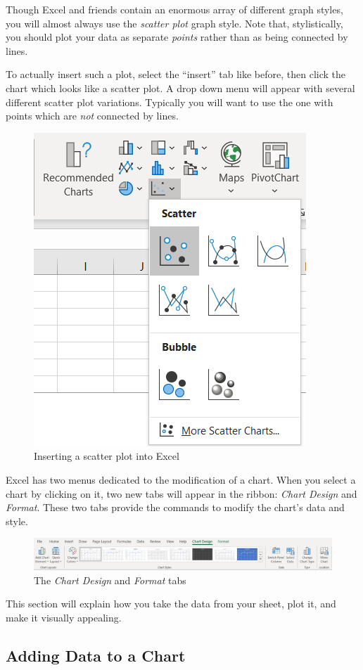 \documentclass[10pt]{article}
\begin{document}
Though Excel and friends contain an enormous array of different graph styles, you will almost always use the \textit{scatter plot} graph style. Note that, stylistically, you should plot your data as separate \textit{points} rather than as being connected by lines.

To actually insert such a plot, select the ``insert'' tab like before, then click the chart which looks like a scatter plot. A drop down menu will appear with several different scatter plot variations. Typically you will want to use the one with points which are \textit{not} connected by lines.

\begin{figure}[htpb]
	\centering
	\includegraphics[width=0.3\linewidth]{images/insert-scatter-plot.png}
	\caption{Inserting a scatter plot into Excel}%
	\label{fig:images_insert-scatter-plot}
\end{figure}


Excel has two menus dedicated to the modification of a chart. When you select a chart by clicking on it, two new tabs will appear in the ribbon: \textit{Chart Design} and \textit{Format}. These two tabs provide the commands to modify the chart's data and style.

\begin{figure}[htpb]
	\centering
	\includegraphics[width=1\linewidth]{images/chart-design-format.png}
	\caption{The \textit{Chart Design} and \textit{Format} tabs}%
	\label{fig:images_chart-design-format}
\end{figure}

This section will explain how you take the data from your sheet, plot it, and make it visually appealing.


\subsection{Adding Data to a Chart}%
\label{sub:adding_data_to_a_chart}
\end{document}
